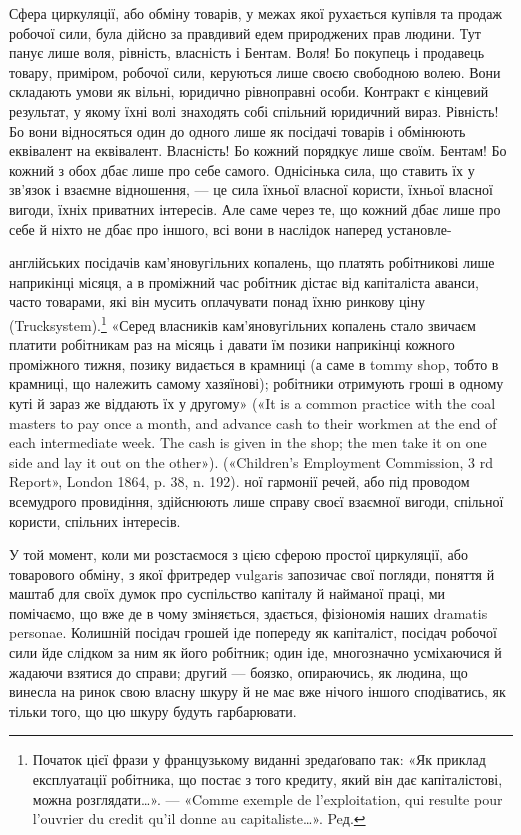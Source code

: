 Сфера циркуляції, або обміну товарів, у межах якої рухається
купівля та продаж робочої сили, була дійсно за правдивий
едем природжених прав людини. Тут панує лише воля, рівність,
власність і Бентам. Воля! Бо покупець і продавець товару, приміром,
робочої сили, керуються лише своєю свободною волею.
Вони складають умови як вільні, юридично рівноправні особи.
Контракт є кінцевий результат, у якому їхні волі знаходять собі
спільний юридичний вираз. Рівність! Бо вони відносяться один
до одного лише як посідачі товарів і обмінюють еквівалент на
еквівалент. Власність! Бо кожний порядкує лише своїм. Бентам!
Бо кожний з обох дбає лише про себе самого. Однісінька
сила, що ставить їх у зв’язок і взаємне відношення, — це сила
їхньої власної користи, їхньої власної вигоди, їхніх приватних
інтересів. Але саме через те, що кожний дбає лише про себе й
ніхто не дбає про іншого, всі вони в наслідок наперед установле-

англійських посідачів кам’яновугільних копалень, що платять робітникові
лише наприкінці місяця, а в проміжний час робітник дістає від капіталіста
аванси, часто товарами, які він мусить оплачувати понад їхню
ринкову ціну (Trucksystem).\footnote*{
Початок цієї фрази у французькому виданні зредаґовапо так: «Як
приклад експлуатації робітника, що постає з того кредиту, який він дає
капіталістові, можна розглядати\dots{}». — «Comme exemple de l’exploitation,
qui resulte pour l’ouvrier du credit qu’il donne au capitaliste\dots{}». Peд.
} «Серед власників кам’яновугільних копалень
стало звичаєм платити робітникам раз на місяць і давати їм позики
наприкінці кожного проміжного тижня, позику видається в крамниці
(а саме в tommy shop, тобто в крамниці, що належить самому хазяїнові);
робітники отримують гроші в одному куті й зараз же віддають їх у другому»
(«It is a common practice with the coal masters to pay once a month,
and advance cash to their workmen at the end of each intermediate week.
The cash is given in the shop; the men take it on one side and lay it out on
the other»). («Children’s Employment Commission, 3 rd Report», London
1864, p. 38, n. 192).
ної гармонії речей, або під проводом всемудрого провидіння,
здійснюють лише справу своєї взаємної вигоди, спільної користи,
спільних інтересів.

У той момент, коли ми розстаємося з цією сферою простої
циркуляції, або товарового обміну, з якої фритредер vulgaris
запозичає свої погляди, поняття й маштаб для своїх думок про
суспільство капіталу й найманої праці, ми помічаємо, що вже де
в чому зміняється, здається, фізіономія наших dramatis personae.
Колишній посідач грошей іде попереду як капіталіст, посідач
робочої сили йде слідком за ним як його робітник; один іде,
многозначно усміхаючися й жадаючи взятися до справи; другий —
боязко, опираючись, як людина, що винесла на ринок свою власну
шкуру й не має вже нічого іншого сподіватись, як тільки того,
що цю шкуру будуть гарбарювати.
